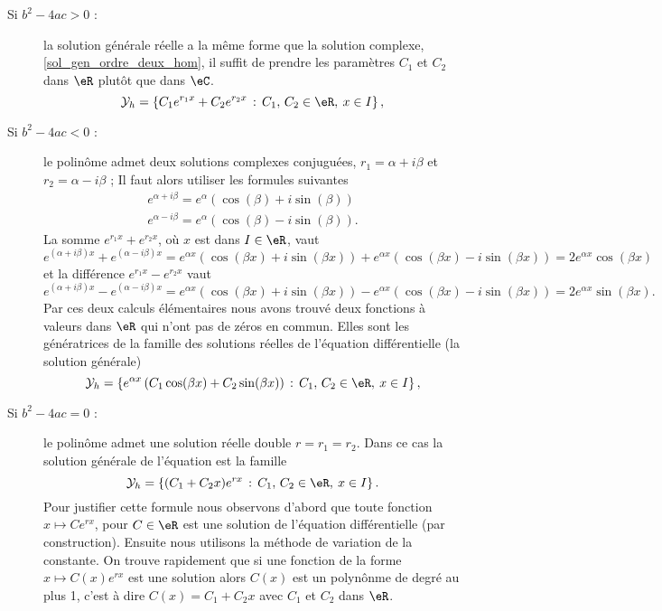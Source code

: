 \begin{description}
  \item[Si $b^2 - 4ac >0$ :] la solution générale réelle a la m\^eme forme que la solution complexe, \eqref{sol_gen_ordre_deux_hom}, il suffit de prendre les paramètres $C_1$ et $C_2$ dans $\eR$ plut\^ot que dans $\eC$. 
\begin{equation}\label{sol_gen_reelle_ordre_deux_hom}
  \mathcal{Y}_h  = \left\{C_1 e^{r_1x} +C_2 e^{r_2x} \,:\, C_1,\, C_2 \in \eR, \: x\in I\right\},
\end{equation}
  \item[Si $b^2 - 4ac <0$ :] le polin\^ome admet deux solutions complexes conjuguées, $r_1 = \alpha + i \beta$ et $r_2 = \alpha - i \beta$ ; Il faut alors utiliser les formules suivantes 
    \begin{equation}
      \begin{array}{l}
        e^{\alpha + i \beta} =e^{\alpha}(\cos(\beta) + i \sin(\beta))\\
        e^{\alpha - i \beta} =e^{\alpha}(\cos(\beta) - i \sin(\beta)).
      \end{array}
    \end{equation}
    La somme $e^{r_1x} +e^{r_2x}$, où $x$ est dans $I\in\eR$, vaut 
    \[
    e^{(\alpha + i \beta)x} + e^{(\alpha - i \beta)x}=e^{\alpha x}(\cos(\beta x) + i \sin(\beta x )) + e^{\alpha x}(\cos(\beta x) - i \sin(\beta x)) =2 e^{\alpha x}\cos(\beta x)
    \]
    et la différence $e^{r_1x} -e^{r_2x}$ vaut
    \[
    e^{(\alpha + i \beta)x} - e^{(\alpha - i \beta)x}=e^{\alpha x}(\cos(\beta x) + i \sin(\beta x )) - e^{\alpha x}(\cos(\beta x) - i \sin(\beta x)) =2 e^{\alpha x}\sin(\beta x).
    \]
    Par ces deux calculs élémentaires nous avons trouvé deux fonctions à valeurs dans $\eR$ qui n'ont pas de zéros en commun. Elles sont les génératrices de la famille des solutions réelles de l'équation différentielle (la solution générale)
    \begin{equation}\label{sol_gen_reelle_ordre_deux_hom_complconj}
      \mathcal{Y}_h  = \left\{ e^{\alpha x}\left(C_1\cos(\beta x) +C_2\sin(\beta x)\right)  \,:\, C_1,\, C_2 \in \eR, \: x\in I\right\},
    \end{equation}
  \item[Si $b^2 - 4ac =0$ :] le polin\^ome admet une solution réelle double $r=r_1 = r_2$. Dans ce cas la solution générale de l'équation est la famille
    \begin{equation}\label{sol_gen_reelle_ordre_deux_hom_doublerac}
      \mathcal{Y}_h  = \left\{(C_1  +C_2x) e^{r x} \,:\, C_1,\, C_2 \in \eR, \: x\in I\right\}.
    \end{equation} 
    Pour justifier cette formule nous observons d'abord que toute fonction $x\mapsto Ce^{rx}$, pour $C\in\eR$ est une solution de l'équation différentielle (par construction). Ensuite nous utilisons la méthode de variation de la constante. On trouve rapidement que si une fonction de la forme $x\mapsto C(x)e^{rx}$ est une solution alors $C(x)$ est un polyn\^onme de degré au plus 1, c'est à dire $C(x) = C_1 + C_2 x$ avec $C_1$ et $C_2$ dans $\eR$. 
\end{description}

